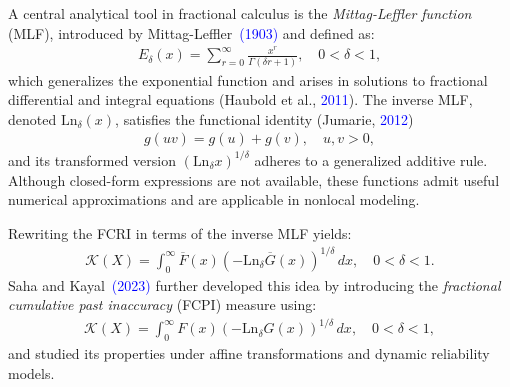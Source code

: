 \documentclass[12pt, a4paper]{article}
\numberwithin{equation}{section}
\begin{document}
A central analytical tool in fractional calculus is the \textit{Mittag-Leffler function} (MLF), introduced by Mittag-Leffler~\textcolor{blue}{(1903)} and defined as:
\begin{align}
	E_\delta(x) = \sum_{r=0}^\infty \frac{x^r}{\Gamma(\delta r + 1)}, \quad 0 < \delta < 1,
\end{align}
which generalizes the exponential function and arises in solutions to fractional differential and integral equations (Haubold et al., \textcolor{blue}{2011}). The inverse MLF, denoted $\text{Ln}_\delta(x)$, satisfies the functional identity (Jumarie, \textcolor{blue}{2012})
\begin{align}
	g(uv) = g(u) + g(v), \quad u, v > 0,
\end{align}
and its transformed version $\left(\text{Ln}_\delta x\right)^{1/\delta}$ adheres to a generalized additive rule. Although closed-form expressions are not available, these functions admit useful numerical approximations and are applicable in nonlocal modeling.

Rewriting the FCRI in terms of the inverse MLF yields:
\begin{align}
	\mathcal{K}(X) = \int_0^\infty \overline{F}(x) \left(-\text{Ln}_\delta \overline{G}(x)\right)^{1/\delta} \, dx, \quad 0 < \delta < 1.
\end{align}
Saha and Kayal~\textcolor{blue}{(2023)} further developed this idea by introducing the \textit{fractional cumulative past inaccuracy} (FCPI) measure using:
\begin{align}
	\mathcal{K}(X) = \int_0^\infty F(x) \left(-\text{Ln}_\delta G(x)\right)^{1/\delta} \, dx, \quad 0 < \delta < 1,
\end{align}
and studied its properties under affine transformations and dynamic reliability models.
\end{document}
